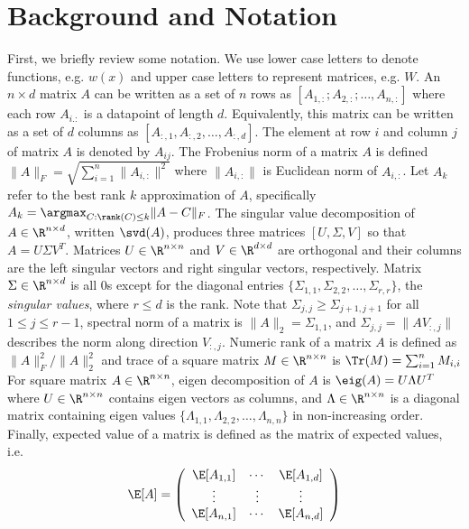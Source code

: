 \documentclass{sig-alternate}
\begin{document}
\section{Background and Notation}
First, we briefly review some notation. We use lower case letters to denote functions, e.g. $w(x)$ and upper case letters to represent matrices, e.g. $W$. An $n \times d$ matrix $A$ can be written as a set of $n$ rows as $[A_{1,:}; A_{2,:}; \ldots, A_{n,:}]$ where each row $A_{i.:}$ is a datapoint of length $d$. Equivalently, this matrix can be written as a set of $d$ columns as $[A_{:,1}, A_{:,2}, \ldots, A_{:,d}]$. The element at row $i$ and column $j$ of matrix $A$ is denoted by $A_{ij}$.
The Frobenius norm of a matrix $A$ is defined $\|A\|_F = \sqrt{\sum_{i=1}^n \|A_{i,:}\|^2}$ where $\|A_{i,:}\|$ is Euclidean norm of $A_{i,:}$.  
Let $A_k$ refer to the best rank $k$ approximation of $A$, specifically $A_k = {\argmax}_{C : \rank(C) \leq k} \|A - C\|_F$.  
The singular value decomposition of $A \in \R^{n \times d}$, written $\svd(A)$, produces three matrices $[U,\Sigma,V]$ so that $A = U \Sigma V^T$.  Matrices $U \in \R^{n \times n}$ and $V \in \R^{d \times d}$ are orthogonal and their columns are the left singular vectors and right singular vectors, respectively. Matrix $\Sigma \in \R^{n \times d}$ is all $0$s except for the diagonal entries $\{\Sigma_{1,1}, \Sigma_{2,2}, \ldots, \Sigma_{r,r}\}$, the \emph{singular values}, where $r \leq d$ is the rank.  Note that $\Sigma_{j,j} \geq \Sigma_{j+1,j+1}$ for all $1 \leq j \leq r-1$, spectral norm of a matrix is $\|A\|_2 = \Sigma_{1,1}$, and $\Sigma_{j,j} = \|A V_{:,j}\|$ describes the norm along direction $V_{:,j}$.  
Numeric rank of a matrix $A$ is defined as $\|A\|_F^2/\|A\|_2^2$ and trace of a square matrix $M \in \R^{n \times n}$ is $\Tr(M) = \sum_{i=1}^n M_{i,i}$
For square matrix $A \in \R^{n \times n}$, eigen decomposition of $A$ is $\eig(A) = U \Lambda U^T$ where $U \in \R^{n \times n}$ contains eigen vectors as columns, and $\Lambda \in \R^{n \times n}$ is a diagonal matrix containing eigen values $\{\Lambda_{1,1}, \Lambda_{2,2}, \ldots, \Lambda_{n,n}\}$ in non-increasing order. 
Finally, expected value of a matrix is defined as the matrix of expected values, i.e. 
\[
\E[A] = \left( \begin{array}{ccc} \E[A_{1,1}] & \cdots & \E[A_{1,d}] \\ \vdots & \vdots & \vdots \\ \E[A_{n,1}] & \cdots & \E[A_{n,d}] \end{array} \right)
\]
\end{document}
